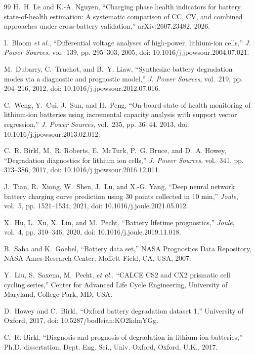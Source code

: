 \documentclass[12pt,a4paper]{amritareport}
\begin{document}
\begin{thebibliography}{99}
H.~H. Le and K.-A. Nguyen, ``Charging phase health indicators for battery state-of-health estimation: A systematic comparison of {CC}, {CV}, and combined approaches under cross-battery validation,'' arXiv:2607.23482, 2026.

I.~Bloom \emph{et al.}, ``Differential voltage analyses of high-power, lithium-ion cells,'' \emph{J. Power Sources}, vol.~139, pp. 295--303, 2005, doi: 10.1016/j.jpowsour.2004.07.021.

M.~Dubarry, C.~Truchot, and B.~Y. Liaw, ``Synthesize battery degradation modes via a diagnostic and prognostic model,'' \emph{J. Power Sources}, vol.~219, pp. 204--216, 2012, doi: 10.1016/j.jpowsour.2012.07.016.

C.~Weng, Y.~Cui, J.~Sun, and H.~Peng, ``On-board state of health monitoring of lithium-ion batteries using incremental capacity analysis with support vector regression,'' \emph{J. Power Sources}, vol.~235, pp. 36--44, 2013, doi: 10.1016/j.jpowsour.2013.02.012.

C.~R. Birkl, M.~R. Roberts, E.~McTurk, P.~G. Bruce, and D.~A. Howey, ``Degradation diagnostics for lithium ion cells,'' \emph{J. Power Sources}, vol.~341, pp. 373--386, 2017, doi: 10.1016/j.jpowsour.2016.12.011.

J.~Tian, R.~Xiong, W.~Shen, J.~Lu, and X.-G. Yang, ``Deep neural network battery charging curve prediction using 30 points collected in 10 min,'' \emph{Joule}, vol.~5, pp. 1521--1534, 2021, doi: 10.1016/j.joule.2021.05.012.

X.~Hu, L.~Xu, X.~Lin, and M.~Pecht, ``Battery lifetime prognostics,'' \emph{Joule}, vol.~4, pp. 310--346, 2020, doi: 10.1016/j.joule.2019.11.018.

B.~Saha and K.~Goebel, ``Battery data set,'' NASA Prognostics Data Repository, NASA Ames Research Center, Moffett Field, CA, USA, 2007.

Y.~Liu, S.~Saxena, M.~Pecht, \emph{et al.}, ``{CALCE} {CS2} and {CX2} prismatic cell cycling series,'' Center for Advanced Life Cycle Engineering, University of Maryland, College Park, MD, USA.

D.~Howey and C.~Birkl, ``Oxford battery degradation dataset 1,'' University of Oxford, 2017, doi: 10.5287/bodleian:KO2kdmYGg.

C.~R. Birkl, ``Diagnosis and prognosis of degradation in lithium-ion batteries,'' Ph.D. dissertation, Dept. Eng. Sci., Univ. Oxford, Oxford, U.K., 2017.


\end{thebibliography}
\end{document}
